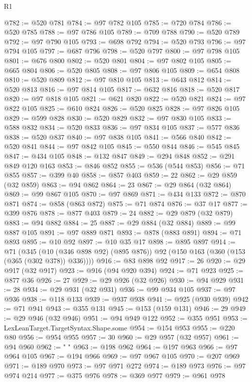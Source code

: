 \begin{lexlean}{R1}
\begin{coremodule}
@782 := @520 @781
@784 := @97 @782 @105
@785 := @720 @784
@786 := @520 @785
@788 := @97 @786 @105
@789 := @709 @788
@790 := @520 @789
@792 := @97 @790 @105
@793 := @698 @792
@794 := @520 @793
@796 := @97 @794 @105
@797 := @687 @796
@798 := @520 @797
@800 := @97 @798 @105
@801 := @676 @800
@802 := @520 @801
@804 := @97 @802 @105
@805 := @665 @804
@806 := @520 @805
@808 := @97 @806 @105
@809 := @654 @808
@810 := @520 @809
@812 := @97 @810 @105
@813 := @643 @812
@814 := @520 @813
@816 := @97 @814 @105
@817 := @632 @816
@818 := @520 @817
@820 := @97 @818 @105
@821 := @621 @820
@822 := @520 @821
@824 := @97 @822 @105
@825 := @610 @824
@826 := @520 @825
@828 := @97 @826 @105
@829 := @599 @828
@830 := @520 @829
@832 := @97 @830 @105
@833 := @588 @832
@834 := @520 @833
@836 := @97 @834 @105
@837 := @577 @836
@838 := @520 @837
@840 := @97 @838 @105
@841 := @566 @840
@842 := @520 @841
@844 := @97 @842 @105
@845 := @550 @844
@846 := @545 @845
@847 := @434 @105
@848 := @132 @847
@849 := @294 @848
@852 := @291 @849 @120 @163
@853 := @846 @852
@855 := @536 (@544 @853)
@856 := @71 @855
@857 := @399 @40
@858 := @857 @403
@859 := 22
@862 := @29 @859 (@32 @859)
@863 := @94 @862
@864 := 23
@867 := @29 @864 (@32 @864)
@869 := @99 @867 @105
@870 := @97 @869
@871 := @434 @133
@872 := @870 @871
@874 := @858 (@863 @872)
@875 := @71 @874
@876 := @37 @17
@877 := @399 @876
@878 := @877 @403
@879 := 24
@882 := @29 @879 (@32 @879)
@883 := @94 @882
@884 := 25
@887 := @29 @884 (@32 @884)
@889 := @99 @887 @105
@891 := @97 @889 @871
@893 := @878 (@883 @891)
@894 := @71 @893
@895 := @10 @92
@897 := @10 @35 @17
@898 := @895 @897
@914 := @71
    (@345 (@10 (@346 @898 @92) (@895 @876)) @92 (@150 @163 (@360 (@153 (@365 (@302 @378)) @336))))
@916 := @83 @898 @92
@917 := 26
@920 := @29 @917 (@32 @917)
@923 := @916 (@94 @920 @394)
@924 := @71 @923
@925 := @877 @36
@926 := 27
@929 := @29 @926 (@32 @926)
@930 := @94 @929
@931 := 28
@934 := @29 @931 (@32 @931)
@936 := @99 @934 @105
@937 := @97 @936
@938 := @118 @133
@939 := @937 @938
@941 := @925 (@930 @939)
@942 := @71 @941
@943 := @355 @131
@945 := @153 (@159 @131)
@946 := 29
@949 := @29 @946 (@32 @946)
@951 := @94 @949 @122
@952 := @355 @951
@953 := LexLeanTarget.TargetSyntax.Shape.some
@954 := @154 @953
@955 := @220 @80
@956 := @954 @955
@957 := 30
@960 := @29 @957 (@32 @957)
@961 := @94 @960
@962 := " "
@963 := @198 @962
@964 := @197 @963
@966 := @97 @964 @105
@967 := @194 @966
@969 := @97 @967 @105
@970 := @207 @969
@971 := @189 @970
@973 := @97 @971 @272
@974 := @189 @973
@976 := @97 @974 @214
@977 := @375 @976
@978 := @369 @977
@979 := @961 @978

\end{coremodule}
\end{lexlean}
